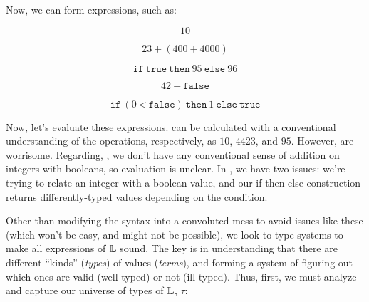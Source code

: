 Now, we can form expressions, such as:

\begin{equation}
      10
      \label{ex:sl:s:good1}
\end{equation}

\begin{equation}
      23 + (400\ \texttt{+}\ 4000)
      \label{ex:sl:s:good2}
\end{equation}

\begin{equation}
      \texttt{if}\ \texttt{true}\ \texttt{then}\ 95\ \texttt{else}\ 96
      \label{ex:sl:s:good3}
\end{equation}

\begin{equation}
      42\ \texttt{+}\ \texttt{false}
      \label{ex:sl:s:bad1}
\end{equation}

\begin{equation}
      \texttt{if}\ (0\ \texttt{<}\ \texttt{false})\ \texttt{then}\ 1\ \texttt{else}\ \texttt{true}
      \label{ex:sl:s:bad2}
\end{equation}


Now, let's evaluate these expressions.
 can be calculated with a
conventional understanding of the operations, respectively, as \(10\), \(4423\),
and \(95\). However,  are worrisome. Regarding,
, we don't have any conventional sense of addition on
integers with booleans, so evaluation is unclear. In , we
have two issues: we're trying to relate an integer with a boolean value, and our
if-then-else construction returns differently-typed values depending on the
condition.


Other than modifying the syntax into a convoluted mess to avoid issues like
these (which won't be easy, and might not be possible), we look to type systems
to make all expressions of \(\mathbb{L}\) sound. The key is in understanding that
there are different ``kinds'' (\textit{types}) of values (\textit{terms}), and
forming a system of figuring out which ones are valid (well-typed) or not
(ill-typed). Thus, first, we must analyze and capture our universe of types of
\(\mathbb{L}\), \(\tau\):


